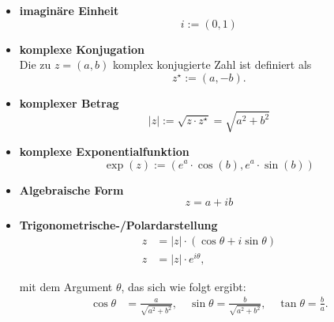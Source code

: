 \documentclass{article}
\begin{document}
	\begin{itemize}
		\item \textbf{imaginäre Einheit}
			\begin{equation}
				i := (0,1)
			\end{equation}
		
		
		\item \textbf{komplexe Konjugation}\\
		Die zu $z = (a,b)$ komplex konjugierte Zahl ist definiert als
			\begin{equation}
				z^\star := (a,-b).
			\end{equation}
		
		
		\item \textbf{komplexer Betrag}
			\begin{equation}
				|z| := \sqrt{z \cdot z^\star} = \sqrt{a^2 + b^2}
			\end{equation}
		
		
		\item \textbf{komplexe Exponentialfunktion}
			\begin{equation}
				\exp(z) := (e^a \cdot \cos(b), e^a \cdot \sin(b))
			\end{equation}
	\end{itemize}


	\begin{itemize}
		\item \textbf{Algebraische Form}\\
			\begin{equation}
				z = a+ib
			\end{equation}	


		\item \textbf{Trigonometrische-/Polardarstellung}
			\begin{align}
				z &= |z| \cdot (\cos\theta + i\sin\theta)\\
				z &= |z| \cdot e^{i\theta},
			\end{align}
			
		mit dem Argument $\theta$, das sich wie folgt ergibt:
			\begin{align}
				\cos\theta &= \frac{a}{\sqrt{a^2 + b^2}},\quad
				\sin\theta = \frac{b}{\sqrt{a^2 + b^2}},\quad 
				\tan\theta = \frac{b}{a}.
			\end{align}
	\end{itemize}
\end{document}
